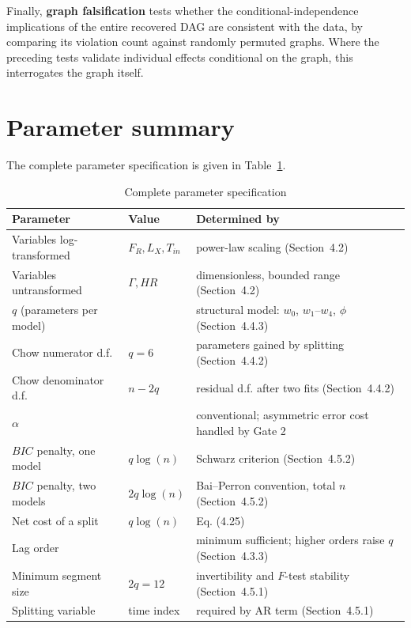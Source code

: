 Finally, \textbf{graph falsification} tests whether the conditional-independence
implications of the entire recovered DAG are consistent with the data, by comparing
its violation count against randomly permuted graphs. Where the preceding tests
validate individual effects conditional on the graph, this interrogates the graph
itself.


\section{Parameter summary}

The complete parameter specification is given in Table~\ref{tab:ch4-parameters}.



\begin{table}[htbp]
    \centering
    \small
    \caption{Complete parameter specification}
    \label{tab:ch4-parameters}
    \begin{tabularx}{\textwidth}{|>{\raggedright\arraybackslash}X|>{\raggedright\arraybackslash}p{1.7cm}|>{\raggedright\arraybackslash}X|}
        \hline
        Parameter & Value & Determined by \\ \hline
        Variables log-transformed & $F_R, L_X, T_{in}$ & power-law scaling (Section~4.2) \\ \hline
        Variables untransformed & $\Gamma, HR$ & dimensionless, bounded range (Section~4.2) \\ \hline
        $q$ (parameters per model) & 6 & structural model: $w_0$, $w_1$--$w_4$, $\phi$ (Section~4.4.3) \\ \hline
        Chow numerator d.f. & $q = 6$ & parameters gained by splitting (Section~4.4.2) \\ \hline
        Chow denominator d.f. & $n - 2q$ & residual d.f. after two fits (Section~4.4.2) \\ \hline
        $\alpha$ & 0.05 & conventional; asymmetric error cost handled by Gate 2 \\ \hline
        $BIC$ penalty, one model & $q\log(n)$ & Schwarz criterion (Section~4.5.2) \\ \hline
        $BIC$ penalty, two models & $2q\log(n)$ & Bai--Perron convention, total $n$ (Section~4.5.2) \\ \hline
        Net cost of a split & $q\log(n)$ & Eq. (4.25) \\ \hline
        Lag order & 1 & minimum sufficient; higher orders raise $q$ (Section~4.3.3) \\ \hline
        Minimum segment size & $2q = 12$ & invertibility and $F$-test stability (Section~4.5.1) \\ \hline
        Splitting variable & time index & required by AR term (Section~4.5.1) \\ \hline
\end{tabularx}
\end{table}


